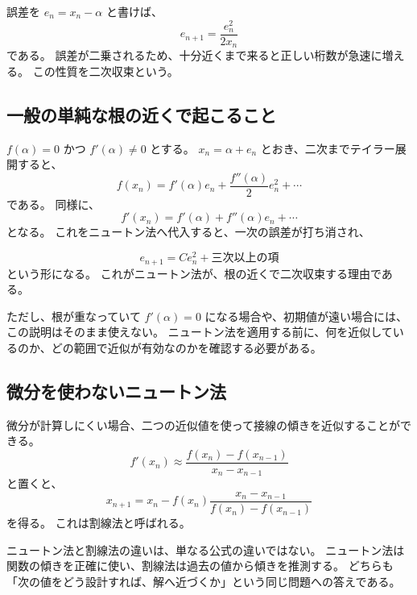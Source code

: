誤差を $e_n=x_n-\alpha$ と書けば、
\[
  e_{n+1}=\frac{e_n^2}{2x_n}
\]
である。
誤差が二乗されるため、十分近くまで来ると正しい桁数が急速に増える。
この性質を二次収束という。

\subsection{一般の単純な根の近くで起こること}

$f(\alpha)=0$ かつ $f'(\alpha)\neq0$ とする。
$x_n=\alpha+e_n$ とおき、二次までテイラー展開すると、
\[
  f(x_n)=f'(\alpha)e_n+\frac{f''(\alpha)}2e_n^2+\cdots
\]
である。
同様に、
\[
  f'(x_n)=f'(\alpha)+f''(\alpha)e_n+\cdots
\]
となる。
これをニュートン法へ代入すると、一次の誤差が打ち消され、

\[
  e_{n+1}=C e_n^2+\text{三次以上の項}
\]
という形になる。
これがニュートン法が、根の近くで二次収束する理由である。

ただし、根が重なっていて $f'(\alpha)=0$ になる場合や、初期値が遠い場合には、この説明はそのまま使えない。
ニュートン法を適用する前に、何を近似しているのか、どの範囲で近似が有効なのかを確認する必要がある。

\subsection{微分を使わないニュートン法}

微分が計算しにくい場合、二つの近似値を使って接線の傾きを近似することができる。
\[
  f'(x_n)\approx
  \frac{f(x_n)-f(x_{n-1})}{x_n-x_{n-1}}
\]
と置くと、
\[
  x_{n+1}
  =
  x_n
  -
  f(x_n)
  \frac{x_n-x_{n-1}}{f(x_n)-f(x_{n-1})}
\]
を得る。
これは割線法と呼ばれる。

ニュートン法と割線法の違いは、単なる公式の違いではない。
ニュートン法は関数の傾きを正確に使い、割線法は過去の値から傾きを推測する。
どちらも「次の値をどう設計すれば、解へ近づくか」という同じ問題への答えである。
